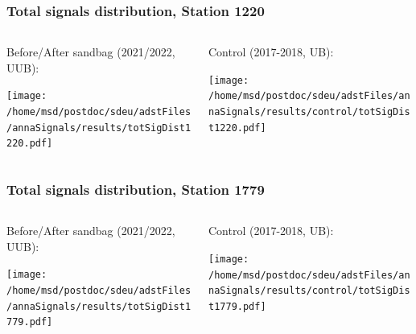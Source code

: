\documentclass[aspectratio=169]{beamer}
\begin{document}
\begin{frame}
  \frametitle{Total signals distribution, Station 1220}
  
  \begin{columns}[T,c]
    \begin{column}{.5\textwidth}
      Before/After sandbag (2021/2022, UUB):
      \vspace{.3cm}

      \texttt{[image: /home/msd/postdoc/sdeu/adstFiles/annaSignals/results/totSigDist1220.pdf]}
    \end{column}
    \begin{column}{.5\textwidth}
      Control (2017-2018, UB):
      \vspace{0.3cm}

      \texttt{[image: /home/msd/postdoc/sdeu/adstFiles/annaSignals/results/control/totSigDist1220.pdf]}
    \end{column}    
\end{columns}
\end{frame}

\begin{frame}
  \frametitle{Total signals distribution, Station 1779}
  
  \begin{columns}[T,c]
    \begin{column}{.5\textwidth}
      Before/After sandbag (2021/2022, UUB):
      \vspace{.3cm}

      \texttt{[image: /home/msd/postdoc/sdeu/adstFiles/annaSignals/results/totSigDist1779.pdf]}
    \end{column}
    \begin{column}{.5\textwidth}
      Control (2017-2018, UB):
      \vspace{0.3cm}

      \texttt{[image: /home/msd/postdoc/sdeu/adstFiles/annaSignals/results/control/totSigDist1779.pdf]}
    \end{column}    
\end{columns}
\end{frame}


\end{document}
